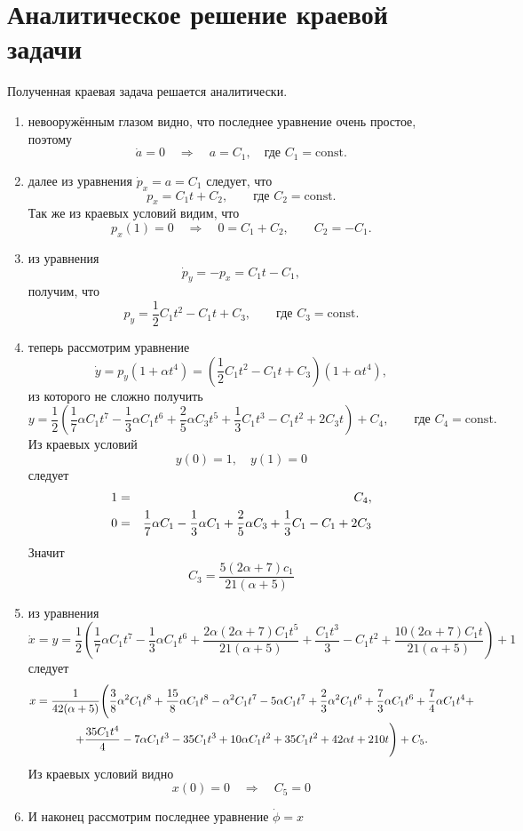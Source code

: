 \section{Аналитическое решение краевой задачи}
Полученная краевая задача решается аналитически.
\begin{enumerate}
\item невооружённым глазом видно, что последнее уравнение очень простое, поэтому
\[
\dot{a} = 0 \quad \Rightarrow \quad
a = C_1, \quad \text{где } C_1 =  \mathrm{const}.
\]

\item далее из уравнения $\dot{p}_x = a = C_1$ следует, что 
\[
p_x = C_1 t + C_2, \qquad
\text{где } C_2 = \mathrm{const}.
\]
Так же из краевых условий видим, что
\[
p_x(1) = 0 \quad \Rightarrow \quad
0 = C_1 + C_2, \qquad
C_2 = -C_1.
\]

\item из уравнения 
\[
\dot{p}_y = - p_x = C_1 t - C_1,
\]
 получим, что 
 \[
 p_y = \frac{1}{2} C_1 t^2 - C_1 t + C_3,
 \qquad 
\text{где } C_3 = \mathrm{const}.
\]
\item теперь рассмотрим уравнение 
\[
\dot{y} = p_y (1 + \alpha t^4) =  \left(\frac{1}{2} C_1 t^2 - C_1 t + C_3 \right) (1 + \alpha t^4),
\]
 из которого не сложно получить
\[
y =
\frac{1}{2} \left(\frac{1}{7} \alpha  C_1 t^7 - \frac{1}{3} \alpha  C_1 t^6+\frac{2}{5} \alpha  C_3 t^5+\frac{1}{3}C_1 t^3 - C_1 t^2+2 C_3 t\right)+C_4, 
\qquad \text{где } C_4 = \mathrm{const}.
\]
Из краевых условий
\[ y(0) = 1,\quad y(1) = 0 
\]
следует
\begin{eqnarray}
1 &=& C_4, \notag \\
0 &=& \frac{1}{7} \alpha  C_1 - \frac{1}{3} \alpha  C_1 +\frac{2}{5} \alpha  C_3 + \frac{1}{3}C_1  - C_1 +2 C_3  \notag
\end{eqnarray}
Значит
\[
C_3 =  \frac{5 (2 \alpha +7) c_1}{21 (\alpha +5)}
\]
\item из уравнения 
\[
\dot{x} = y = \frac{1}{2} \left(\frac{1}{7} \alpha  C_1 t^7-\frac{1}{3} \alpha  C_1 t^6+\frac{2 \alpha  (2 \alpha +7) C_1 t^5}{21 (\alpha +5)}+\frac{C_1 t^3}{3}-C_1 t^2+\frac{10 (2 \alpha +7) C_1 t}{21 (\alpha +5)}\right) + 1
\]
следует
\begin{multline}
x =
\frac{1}{42 (\alpha +5)} \Bigg(\frac{3}{8} \alpha ^2 C_1 t^8+\frac{15}{8} \alpha  C_1 t^8-\alpha ^2 C_1 t^7-5 \alpha  C_1 t^7+\frac{2}{3} \alpha ^2 C_1 t^6
+ \frac{7}{3} \alpha  C_1 t^6+\frac{7}{4} \alpha  C_1 t^4+\\ +\frac{35 C_1 t^4}{4}-7 \alpha  C_1 t^3-35 C_1 t^3+10 \alpha  C_1 t^2+35 C_1 t^2+42 \alpha  t+210 t \Bigg)+C_5. \notag
\end{multline}
Из краевых условий видно
\[
x(0) = 0
\quad \Rightarrow \quad
C_5 = 0
\]
\item И наконец рассмотрим последнее уравнение $\dot\phi = x$


\end{enumerate}
